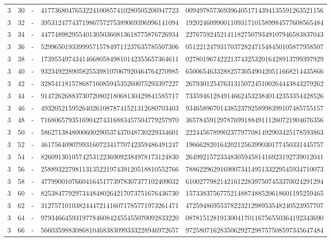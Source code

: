 \begin{longtable}{rrrll}
3 & 30 & - & 4177368047653224100857410280505206947723 & 0094978573693964051714394135591263521156 \\
3 & 32 & - & 3953124774371986757275389069396996141094 & 1920246099001109317101589984577608565484 \\
3 & 34 & - & 4477489829554013050360813618775876726934 & 2276759245214118275079349107946583837043 \\
3 & 36 & - & 5299650193399957157849711237635785507306 & 0512212479317037282471548450105877958507 \\
3 & 38 & - & 1739554974341466805849810142355657364611 & 0278019674222137432532016428913799397929 \\
3 & 40 & - & 9323492289058255398107067920464764270985 & 6500654633288257305490420511668214435866 \\
3 & 42 & - & 3285411815786871608594535260075293397227 & 2679301254763131507245100264443843279262 \\
3 & 44 & - & 9147262688373072080218068130429841585717 & 7335946128491466245323840142353354428526 \\
3 & 46 & - & 4932052159526402610878741521312680703403 & 9346589670143852379258998399107485755157 \\
3 & 48 & - & 7168065793516904274316883457504779257970 & 3657845912978769918849111260721904676356 \\
3 & 50 & - & 5862713848000600290537437048730229334601 & 2224456789902377977081492903425178593863 \\
3 & 52 & - & 4617564090799316072341770742359486491247 & 1966628201642021256399030177450331445757 \\
3 & 54 & - & 8260913010574253122369092384978173124830 & 2649921572334830594581416923192739012041 \\
3 & 56 & - & 2588932279811313522197439120518810552766 & 7886229629169007341495133229545934710073 \\
3 & 58 & - & 4779900107660416451773978307377102409032 & 6100277982142161228397507453370024291294 \\
3 & 60 & - & 8253847792973448480264217073751676436730 & 1573383756775214887488520618601195259465 \\
3 & 62 & - & 3127571010382444721416071785771973261471 & 4725948695537822321298953548240523957707 \\
3 & 64 & - & 9793466459319778460842455455070092833220 & 0878151281913004170116756550364192343690 \\
3 & 66 & - & 5660359883086810468383099333228946972657 & 9725807162835062927298757508597345647484 \\

\end{longtable}
